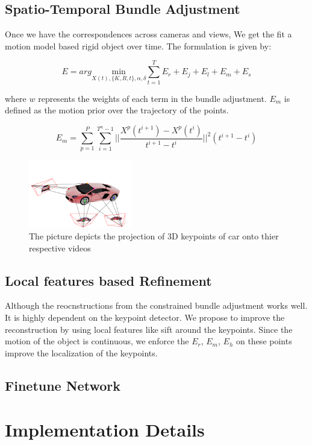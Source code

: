 \documentclass[10pt,twocolumn,letterpaper]{article}
\begin{document}
\subsection{Spatio-Temporal Bundle Adjustment}
Once we have the correspondences across cameras and views, We get the fit a motion model based rigid object over time. The formulation is given by:

\begin{equation}
 E = arg \underset{X(t),\{K,R,t\},\alpha,\delta} {\mathrm{min}} \sum_{t=1}^T E_r +  E_j +  E_l +  E_m + E_s
\end{equation}

where $w$ represents the weights of each term in the bundle adjustment. $E_m$ is defined as the motion prior over the trajectory of the points.

\begin{equation}
E_m = \sum_{p =1 }^P \sum_{i = 1}^{T^n -1} ||\frac{X^p(t^{i+1}) - X^p(t^{i})}{t^{i+1} - t^{i}}||^2 (t^{i+1} - t^{i})
\end{equation}
\begin{figure}
  \centering
    \includegraphics[width=0.4\textwidth]{images/corr}
  \caption{The picture depicts the projection of 3D keypoints of car onto thier respective videos}
  \label{fig:corr}
\end{figure}

\subsection{Local features based Refinement}
Although the reocnstructions from the constrained bundle adjustment works well. It is highly dependent on the keypoint detector. We propose to improve the reconstruction by using local features like sift around the keypoints. Since the motion of the object is continuous, we enforce the $E_r$, $E_m$, $E_h$ on these points improve the localization of the keypoints.
\subsection{Finetune Network}
 
\section{Implementation Details}
\end{document}
